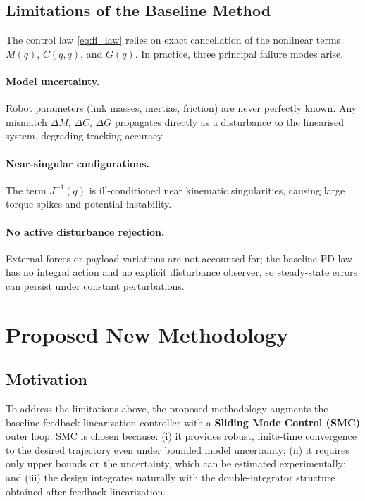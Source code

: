 \documentclass[11pt,a4paper]{article}
\begin{document}
\subsection{Limitations of the Baseline Method}

The control law \eqref{eq:fl_law} relies on exact cancellation of the nonlinear
terms $M(q)$, $C(q,\dot{q})$, and $G(q)$. In practice, three principal failure
modes arise.

\paragraph{Model uncertainty.}
Robot parameters (link masses, inertias, friction) are never perfectly known.
Any mismatch $\Delta M$, $\Delta C$, $\Delta G$ propagates directly as a
disturbance to the linearised system, degrading tracking accuracy.

\paragraph{Near-singular configurations.}
The term $J^{-1}(q)$ is ill-conditioned near kinematic singularities, causing
large torque spikes and potential instability.

\paragraph{No active disturbance rejection.}
External forces or payload variations are not accounted for; the baseline PD
law has no integral action and no explicit disturbance observer, so steady-state
errors can persist under constant perturbations.

\section{Proposed New Methodology}

\subsection{Motivation}

To address the limitations above, the proposed methodology augments the baseline
feedback-linearization controller with a \textbf{Sliding Mode Control (SMC)}
outer loop. SMC is chosen because: (i) it provides robust, finite-time
convergence to the desired trajectory even under bounded model uncertainty;
(ii) it requires only upper bounds on the uncertainty, which can be estimated
experimentally; and (iii) the design integrates naturally with the
double-integrator structure obtained after feedback linearization.
\end{document}
